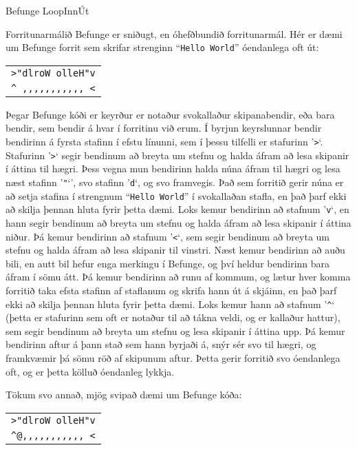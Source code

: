 \begin{problem}{Befunge Loop}{Inn}{Út}{~}{~}

	Forritunarmálið Befunge er sniðugt, en óhefðbundið forritunarmál. Hér er dæmi um Befunge forrit sem skrifar strenginn "`\texttt{Hello World}"' óendanlega oft út:

	\begin{center}
		\begin{tabular}{|c|}
			\hline
			\verb|>"dlroW olleH"v|\\
			\verb|^ ,,,,,,,,,,, <|\\
			\hline
		\end{tabular}
	\end{center}

	Þegar Befunge kóði er keyrður er notaður svokallaður skipanabendir, eða bara bendir, sem bendir á hvar í forritinu við erum. Í byrjun keyrslunnar bendir bendirinn á fyrsta stafinn í efstu línunni, sem í þessu tilfelli er stafurinn '\texttt{>}`. Stafurinn '\texttt{>}` segir bendinum að breyta um stefnu og halda áfram að lesa skipanir í áttina til hægri. Þess vegna mun bendirinn halda núna áfram til hægri og lesa næst stafinn '\texttt{"}`', svo stafinn '\texttt{d}`, og svo framvegis. Það sem forritið gerir núna er að setja stafina í strengnum "`\texttt{Hello World}"' í svokallaðan stafla, en það þarf ekki að skilja þennan hluta fyrir þetta dæmi. Loks kemur bendirinn að stafnum '\texttt{v}`, en hann segir bendinum að breyta um stefnu og halda áfram að lesa skipanir í áttina niður. Þá kemur bendirinn að stafnum '\texttt{<}`, sem segir bendinum að breyta um stefnu og halda áfram að lesa skipanir til vinstri. Næst kemur bendirinn að auðu bili, en autt bil hefur enga merkingu í Befunge, og því heldur bendirinn bara áfram í sömu átt. Þá kemur bendirinn að runu af kommum, og lætur hver komma forritið taka efsta stafinn af staflanum og skrifa hann út á skjáinn, en það þarf ekki að skilja þennan hluta fyrir þetta dæmi. Loks kemur hann að stafnum '\texttt{\^{}}` (þetta er stafurinn sem oft er notaður til að tákna veldi, og er kallaður hattur), sem segir bendinum að breyta um stefnu og lesa skipanir í áttina upp. Þá kemur bendirinn aftur á þann stað sem hann byrjaði á, snýr sér svo til hægri, og framkvæmir þá sömu röð af skipunum aftur. Þetta gerir forritið svo óendanlega oft, og er þetta kölluð óendanleg lykkja.

	Tökum svo annað, mjög svipað dæmi um Befunge kóða:

	\begin{center}
		\begin{tabular}{|c|}
			\hline
			\verb|>"dlroW olleH"v|\\
			\verb|^@,,,,,,,,,,, <|\\
			\hline
		\end{tabular}
	\end{center}


\end{problem}
